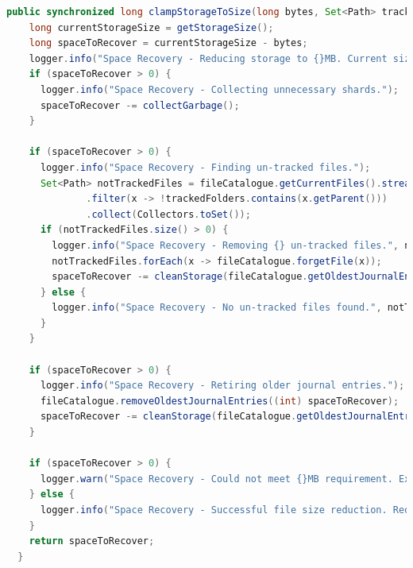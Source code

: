 \documentclass[11pt, a4paper, twoside]{report}
\begin{document}
\begin{lstlisting}[language=Java, caption=Storage Clamping Implementation, label=lst:storageClamping]
  public synchronized long clampStorageToSize(long bytes, Set<Path> trackedFolders) throws StorageManagerException {
    long currentStorageSize = getStorageSize();
    long spaceToRecover = currentStorageSize - bytes;
    logger.info("Space Recovery - Reducing storage to {}MB. Current size {}MB. Need to remove {}MB", ((float) bytes) / (1024 * 1024), ((float) currentStorageSize) / (1024 * 1024), ((float) Math.max(spaceToRecover, 0)) / (1024 * 1024));
    if (spaceToRecover > 0) {
      logger.info("Space Recovery - Collecting unnecessary shards.");
      spaceToRecover -= collectGarbage();
    }

    if (spaceToRecover > 0) {
      logger.info("Space Recovery - Finding un-tracked files.");
      Set<Path> notTrackedFiles = fileCatalogue.getCurrentFiles().stream()
              .filter(x -> !trackedFolders.contains(x.getParent()))
              .collect(Collectors.toSet());
      if (notTrackedFiles.size() > 0) {
        logger.info("Space Recovery - Removing {} un-tracked files.", notTrackedFiles.size());
        notTrackedFiles.forEach(x -> fileCatalogue.forgetFile(x));
        spaceToRecover -= cleanStorage(fileCatalogue.getOldestJournalEntryTime());
      } else {
        logger.info("Space Recovery - No un-tracked files found.", notTrackedFiles.size());
      }
    }

    if (spaceToRecover > 0) {
      logger.info("Space Recovery - Retiring older journal entries.");
      fileCatalogue.removeOldestJournalEntries((int) spaceToRecover);
      spaceToRecover -= cleanStorage(fileCatalogue.getOldestJournalEntryTime());
    }

    if (spaceToRecover > 0) {
      logger.warn("Space Recovery - Could not meet {}MB requirement. Excess is {}MB.", ((float) bytes) / (1024 * 1024), ((float) spaceToRecover) / (1024 * 1024));
    } else {
      logger.info("Space Recovery - Successful file size reduction. Reduced to {}MB.", ((float) (bytes + spaceToRecover)) / (1024 * 1024));
    }
    return spaceToRecover;
  }
\end{lstlisting}
\end{document}
